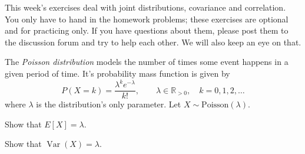 \documentclass[a4paper,10pt,landscape,twocolumn]{scrartcl}
\DeclareMathOperator{\Var}{Var}
\begin{document}
\practiceproblems

{\sffamily\noindent
This week's exercises deal with joint distributions, covariance and correlation. You only have to hand in the homework problems; these exercises are optional and for practicing only. If you have questions about them, please post them to the discussion forum and try to help each other. We will also keep an eye on that.
}



\begin{exercise}
	The \emph{Poisson distribution} 	models the number of times some event happens in a given period of time. It's probability mass function is given by
	\[
	P(X = k) = {\frac {\lambda ^{k}e^{-\lambda }}{k!}}, \qquad \lambda \in \mathbb{R}_{>0}, \quad k=0,1,2,\dots
	\]
	where $\lambda$ is the distribution's only parameter. Let $X\sim \text{Poisson}(\lambda)$.
	
	\begin{subex}
		Show that $E[X] = \lambda$.
	\end{subex}
	
	\begin{subex}
		Show that $\Var(X) = \lambda$.
	\end{subex}

\end{exercise}
\end{document}
